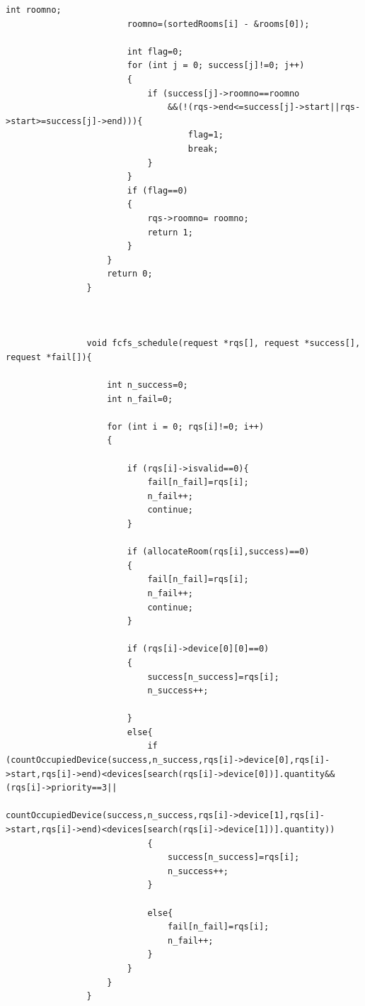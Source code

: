 \documentclass{article}
\begin{document}
\begin{Verbatim}[gobble=8]
                        int roomno;
                        roomno=(sortedRooms[i] - &rooms[0]);
                
                        int flag=0;
                        for (int j = 0; success[j]!=0; j++)
                        {
                            if (success[j]->roomno==roomno
                                &&(!(rqs->end<=success[j]->start||rqs->start>=success[j]->end))){
                                    flag=1;
                                    break;
                            } 
                        }
                        if (flag==0)
                        {
                            rqs->roomno= roomno;
                            return 1;
                        }
                    }
                    return 0;
                }
                
                
                
                void fcfs_schedule(request *rqs[], request *success[], request *fail[]){
                
                    int n_success=0;
                    int n_fail=0;
                
                    for (int i = 0; rqs[i]!=0; i++)
                    {
                
                        if (rqs[i]->isvalid==0){
                            fail[n_fail]=rqs[i];
                            n_fail++;
                            continue;
                        }
                
                        if (allocateRoom(rqs[i],success)==0)
                        {
                            fail[n_fail]=rqs[i];
                            n_fail++;
                            continue;
                        }
                
                        if (rqs[i]->device[0][0]==0)
                        {
                            success[n_success]=rqs[i];
                            n_success++;
                
                        }
                        else{
                            if (countOccupiedDevice(success,n_success,rqs[i]->device[0],rqs[i]->start,rqs[i]->end)<devices[search(rqs[i]->device[0])].quantity&&(rqs[i]->priority==3||
                            countOccupiedDevice(success,n_success,rqs[i]->device[1],rqs[i]->start,rqs[i]->end)<devices[search(rqs[i]->device[1])].quantity))
                            {
                                success[n_success]=rqs[i];
                                n_success++;
                            }
                
                            else{
                                fail[n_fail]=rqs[i];
                                n_fail++;
                            } 
                        }
                    }
                }
            \end{Verbatim}
\end{document}
